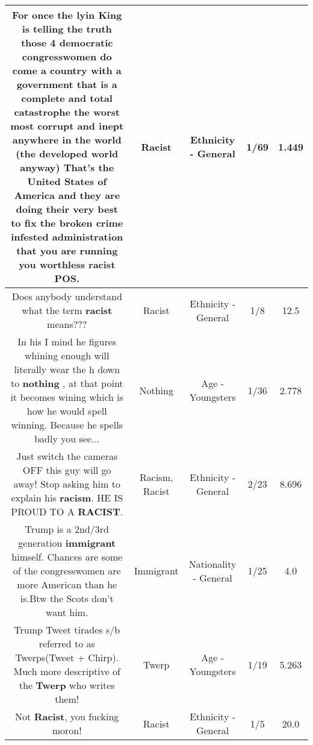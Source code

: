 \documentclass[11pt]{article}
\newlength\mylength
\begin{document}
\begin{center}
\begin{longtable}{|C{.65\mylength}|C{.30\mylength}|C{.12\mylength}|C{.12\mylength}|C{.12\mylength}|}
  \small For once the lyin King is telling the truth those 4 democratic congresswomen do come a country with a government that is a complete and total catastrophe the worst most corrupt and inept anywhere in the world (the developed world anyway) That's the United States of America and they are doing their very best to fix the broken crime infested administration that you are running you worthless \textbf{racist} POS.\normalsize   & Racist & Ethnicity - General & 1/69 & 1.449 \\  \hline
  \small Does anybody understand what the term \textbf{racist} means???\normalsize   & Racist & Ethnicity - General & 1/8 & 12.5 \\  \hline
  \small In his I mind he figures whining enough will literally wear the h down to \textbf{nothing} , at that point it becomes wining which is how he would spell winning.  Because he spells badly you see...\normalsize   & Nothing & Age - Youngsters & 1/36 & 2.778 \\  \hline
  \small Just switch the cameras OFF this guy will go away! Stop asking him to explain his \textbf{racism}. HE IS PROUD TO A \textbf{RACIST}.\normalsize   & Racism, Racist & Ethnicity - General & 2/23 & 8.696 \\  \hline
  \small Trump is a 2nd/3rd generation \textbf{immigrant} himself. Chances are some of the congresswomen are more American than he is.Btw the Scots don't want him.\normalsize   & Immigrant & Nationality - General & 1/25 & 4.0 \\  \hline
  \small Trump Tweet tirades s/b referred to as Twerps(Tweet + Chirp).  Much more descriptive of the \textbf{Twerp} who writes them!\normalsize   & Twerp & Age - Youngsters & 1/19 & 5.263 \\  \hline
  \small Not \textbf{Racist}, you fucking moron!\normalsize   & Racist & Ethnicity - General & 1/5 & 20.0 \\  \hline

\end{longtable}
\end{center}
\end{document}
